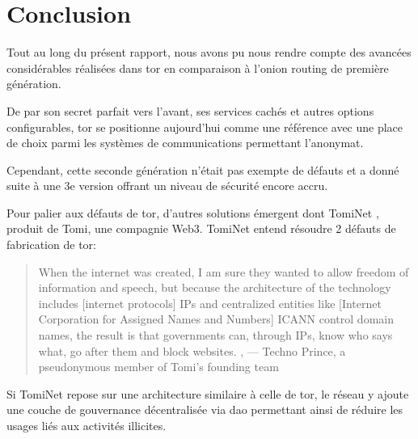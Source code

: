 \section{Conclusion}\label{sec:conclusion}

Tout au long du présent rapport, nous avons pu nous rendre compte des avancées considérables réalisées dans \acrfull{tor} en comparaison à l'onion routing de première génération.

De par son secret parfait vers l'avant, ses services cachés et autres options configurables, \acrshort{tor} se positionne aujourd'hui comme une référence avec une place de choix parmi les systèmes de communications permettant l'anonymat.

Cependant, cette seconde génération n'était pas exempte de défauts et a donné suite à une 3e version offrant un niveau de sécurité encore accru.

Pour palier aux défauts de \acrshort{tor}, d'autres solutions émergent dont TomiNet \cite{adeyanju_how_nodate}, produit de Tomi, une compagnie Web3. 
TomiNet entend résoudre 2 défauts de fabrication de \acrshort{tor}:
\begin{quote}
    \flqq \space When the internet was created, I am sure they wanted to allow freedom of information and speech, but because the architecture of the technology includes [internet protocols] IPs and centralized entities like [Internet Corporation for Assigned Names and Numbers] ICANN control domain names, the result is that governments can, through IPs, know who says what, go after them and block websites. \frqq{}, — Techno Prince, a pseudonymous member of Tomi’s founding team \parencite{adeyanju_how_nodate}
\end{quote} 

Si TomiNet repose sur une architecture similaire à celle de \acrshort{tor}, le réseau y ajoute une couche de gouvernance décentralisée via \acrfull{dao} permettant ainsi de réduire les usages liés aux activités illicites. 